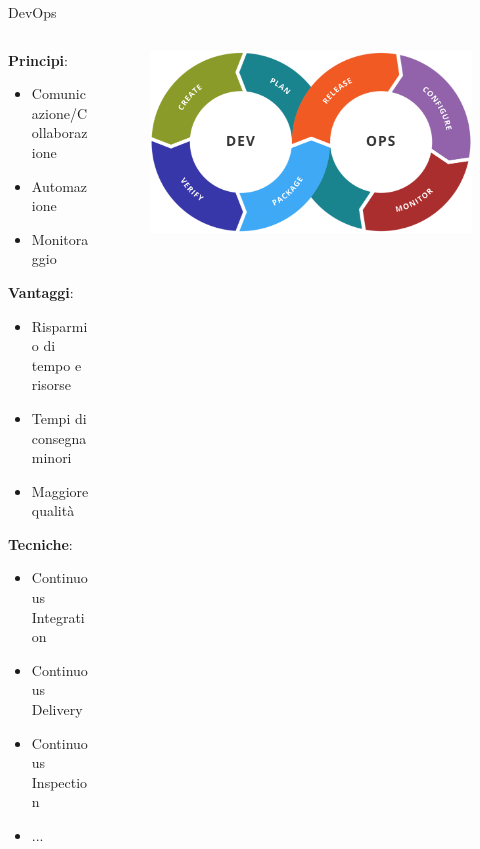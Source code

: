 \begin{frame}{DevOps}
    \begin{columns}[onlytextwidth]
        \begin{column}{0.45\textwidth}
            \textbf{Principi}:
            \begin{itemize}
                \item Comunicazione/Collaborazione
                \item Automazione
                \item Monitoraggio
            \end{itemize}
            \vspace{3mm}
            \textbf{Vantaggi}:
            \begin{itemize}
                \item Risparmio di tempo e risorse
                \item Tempi di consegna minori
                \item Maggiore qualità
            \end{itemize}
            \vspace{3mm}
            \textbf{Tecniche}:
            \begin{itemize}
                \item Continuous Integration
                \item Continuous Delivery
                \item Continuous Inspection
                \item ...
            \end{itemize}
        \end{column}
        \begin{column}{0.55\textwidth}
             \begin{figure}[H]
                \includegraphics[width=1\textwidth]{img/Devops-toolchain.png}
            \end{figure}
        \end{column}
    \end{columns}
\end{frame}


